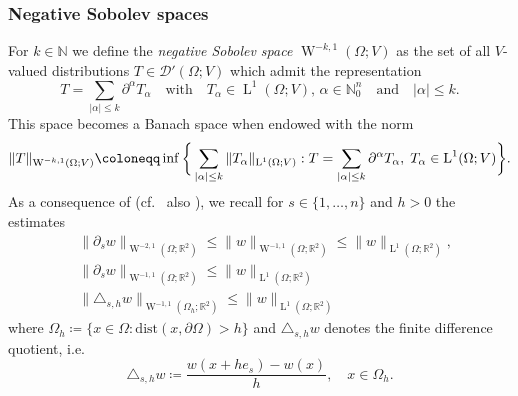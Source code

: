 \documentclass[a4paper,10pt,reqno,oneside]{amsart}
\numberwithin{equation}{section}
\newcommand{\R}{\mathbb R}
\newcommand{\N}{\mathbb N}
\newcommand{\lebe}{\operatorname{L}}
\newcommand{\sobo}{\operatorname{W}}
\newcommand{\del}{\partial}
\newcommand{\abs}[1]{\left\lvert#1\right\rvert}
\begin{document}
\subsubsection{Negative Sobolev spaces} For $k\in\N$ we define the \emph{negative Sobolev space} $\sobo^{-k,1}(\Omega;V)$ as the set of all $V$-valued distributions $T\in\mathscr{D}'(\Omega;V)$ which admit the representation 
\begin{equation*}
	T= \sum_{\abs{\alpha}\leq k} \del^\alpha T_\alpha \quad\mbox{with}\quad T_\alpha\in \lebe^{1}(\Omega;V),\,\alpha\in\N^n_0 \quad\mbox{and}\quad \abs{\alpha}\leq k.
\end{equation*}
This space becomes a Banach space when endowed with the norm 
\begin{equation*}
	\|T\|_{\sobo^{-k,1}(\Omega;V)}\coloneqq \inf \bigg\{ \sum_{\abs{\alpha}\leq k} \|T_\alpha\|_{\lebe^1(\Omega;V)}: T=\sum_{\abs{\alpha}\leq k} \del^\alpha T_\alpha, \hspace{0.1cm} T_\alpha\in \lebe^1(\Omega;V)\bigg\}.
\end{equation*}
As a consequence of \cite[Lem. 2.5]{Gmeineder} (cf.~ also \cite[Sec. 3.2.3]{BEG}), we recall for $s\in\{1,\dots,n\}$ and $h>0$ the estimates
\begin{align}
	&\|\del_s w \|_{\sobo^{-2,1}(\Omega;\R^2)} \leq \|w\|_{\sobo^{-1,1}(\Omega;\R^2)}\leq \|w\|_{\lebe^1(\Omega;\R^2)},\\
	& \|\del_s w\|_{\sobo^{-1,1}(\Omega;\R^2)}\leq \|w\|_{\lebe^1(\Omega;\R^2)}\\
	&\|\triangle_{s,h} w\|_{\sobo^{-1,1}(\Omega_h;\R^2)}\leq\|w\|_{\lebe^1(\Omega;\R^2)}\label{eq:EstimateNegSob3}
\end{align}
where $\Omega_h \coloneqq \{x\in\Omega: \mathrm{dist}(x,\del\Omega)>h\}$ and $\triangle_{s,h} w$ denotes the finite difference quotient, i.e.~
\[
\triangle_{s,h} w \coloneqq \frac{w(x+he_s)- w(x)}{h}, \quad x\in\Omega_h. 
\]


\end{document}
